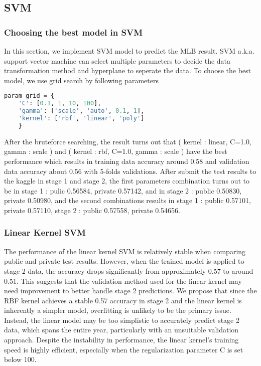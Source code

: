 \subsection*{SVM}

\subsubsection*{Choosing the best model in SVM}

\quad In this section, we implement SVM model to predict the MLB result. 
SVM a.k.a. support vector machine can select multiple parameters to decide the data transformation method 
and hyperplane to seperate the data. To choose the best model, we use grid search by following parameters
\begin{lstlisting}[language=Python]
    param_grid = {
    'C': [0.1, 1, 10, 100],
    'gamma': ['scale', 'auto', 0.1, 1],
    'kernel': ['rbf', 'linear', 'poly']
    }
\end{lstlisting}
\quad After the bruteforce searching, the result turns out that 
( kernel : linear, C=1.0, gamma : scale ) and ( kernel : rbf, C=1.0, gamma : scale ) have the best performance 
which results in training data accuracy around 0.58 and validation data accuracy about 0.56 with 5-folds validations.
After submit the test results to the kaggle in stage 1 and stage 2, 
the first parameters combination turns out to be in 
stage 1 : pulic 0.56584, private 0.57142, and in stage 2 : public 0.50830, private 0.50980, 
and the second combinations results in stage 1 : public 0.57101, private 0.57110, stage 2 : public 0.57558, private 0.54656.

\subsubsection*{Linear Kernel SVM}
\quad The performance of the linear kernel SVM is relatively stable when comparing public and private test results. 
However, when the trained model is applied to stage 2 data, the accuracy drops significantly from approximately 0.57 to around 0.51. 
This suggests that the validation method used for the linear kernel may need improvement to better handle stage 2 predictions. 
We propose that since the RBF kernel achieves a stable 0.57 accuracy in stage 2 and the linear kernel is inherently a simpler model, 
overfitting is unlikely to be the primary issue. 
Instead, the linear model may be too simplistic to accurately predict stage 2 data, 
which spans the entire year, particularly with an unsuitable validation approach. Despite the instability in performance, 
the linear kernel's training speed is highly efficient, especially when the regularization parameter 
C is set below 100.

